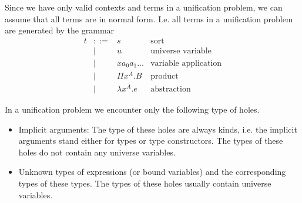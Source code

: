 Since we have only valid contexts and terms in a unification problem, we can
assume that all terms are in normal form. I.e. all terms in a unification
problem are generated by the grammar
$$
\begin{array}{lllll}
    t &::=&  s & \text{sort}
    \\
    &\mid&  u & \text{universe variable}
    \\
    &\mid& x a_0 a_1 \ldots & \text{variable application}
    \\
    &\mid& \Pi x^A. B       & \text{product}
    \\
    &\mid& \lambda x^A. e   & \text{abstraction}
\end{array}
$$


In a unification problem we encounter only the following type of holes.
\begin{itemize}

\item Implicit arguments: The type of these holes are always kinds, i.e. the
implicit arguments stand either for types or type constructors. The types of
these holes do not contain any universe variables.

\item Unknown types of expressions (or bound variables) and the corresponding
types of these types. The types of these holes usually contain universe
variables.

\end{itemize}


